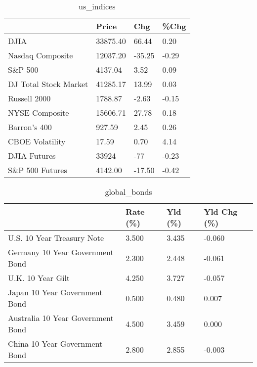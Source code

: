 \documentclass{article}%
\begin{document}
%


\begin{table}[htbp]%
\caption{us\_indices}%
\centering%
\begin{adjustbox}{width=1\textwidth}%
\begin{tabular}{llll}
\toprule
                      &    Price &    Chg &  \%Chg \\
\midrule
                 DJIA & 33875.40 &  66.44 &  0.20 \\
     Nasdaq Composite & 12037.20 & -35.25 & -0.29 \\
              S\&P 500 &  4137.04 &   3.52 &  0.09 \\
DJ Total Stock Market & 41285.17 &  13.99 &  0.03 \\
         Russell 2000 &  1788.87 &  -2.63 & -0.15 \\
       NYSE Composite & 15606.71 &  27.78 &  0.18 \\
         Barron's 400 &   927.59 &   2.45 &  0.26 \\
      CBOE Volatility &    17.59 &   0.70 &  4.14 \\
         DJIA Futures &    33924 &    -77 & -0.23 \\
      S\&P 500 Futures &  4142.00 & -17.50 & -0.42 \\
\bottomrule
\end{tabular}
%
\end{adjustbox}%
\end{table}

%


\begin{table}[htbp]%
\caption{global\_bonds}%
\centering%
\begin{adjustbox}{width=1\textwidth}%
\begin{tabular}{llll}
\toprule
                                  & Rate (\%) & Yld (\%) & Yld Chg (\%) \\
\midrule
       U.S. 10 Year Treasury Note &    3.500 &   3.435 &      -0.060 \\
  Germany 10 Year Government Bond &    2.300 &   2.448 &      -0.061 \\
                U.K. 10 Year Gilt &    4.250 &   3.727 &      -0.057 \\
    Japan 10 Year Government Bond &    0.500 &   0.480 &       0.007 \\
Australia 10 Year Government Bond &    4.500 &   3.459 &       0.000 \\
    China 10 Year Government Bond &    2.800 &   2.855 &      -0.003 \\
\bottomrule
\end{tabular}
%
\end{adjustbox}%
\end{table}
\end{document}
